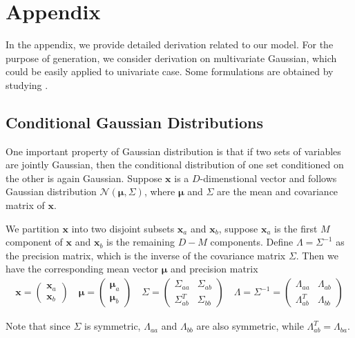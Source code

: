 \newpage
\section{Appendix}
In the appendix, we provide detailed derivation related to our model. For the purpose of generation, we consider derivation on multivariate Gaussian, which could be easily applied to univariate case. Some formulations are obtained by studying \cite{Bishop:2006:PRM:1162264}.
\subsection{Conditional Gaussian Distributions}
{\setlength{\parindent}{0cm}
One important property of Gaussian distribution is that if two sets of variables are jointly Gaussian, then the conditional distribution of one set conditioned on the other is again Gaussian.
Suppose $\mathbf{x}$ is a $D$-dimenstional vector and follows Gaussian distribution $\mathcal{N}\left(\mathbf{\mu},\Sigma\right)$, where $\mathbf{\mu}$ and $\Sigma$ are the mean and covariance matrix of $\mathbf{x}$.

We partition $\mathbf{x}$ into two disjoint subsets $\mathbf{x}_a$ and $\mathbf{x}_b$, suppose $\mathbf{x}_a$ is the first $M$ component of $\mathbf{x}$ and $\mathbf{x}_b$ is the remaining $D-M$ components. Define $\Lambda = \Sigma^{-1}$ as the precision matrix, which is the inverse of the covariance matrix $\Sigma$. Then we have the corresponding mean vector $\mathbf{\mu}$ and precision matrix
\begin{align}
\mathbf{x}=\begin{pmatrix} \mathbf{x}_a \\ \mathbf{x}_b \end{pmatrix}
\quad
\mathbf{\mu}=\begin{pmatrix} \mathbf{\mu}_a \\ \mathbf{\mu}_b \end{pmatrix}
\quad
\Sigma = \begin{pmatrix} 
\Sigma_{aa} & \Sigma_{ab} \\
\Sigma_{ab}^{T} & \Sigma_{bb} 
\end{pmatrix}
\quad
\Lambda = \Sigma^{-1}=\begin{pmatrix} 
\Lambda_{aa} & \Lambda_{ab} \\
\Lambda_{ab}^{T} & \Lambda_{bb} 
\end{pmatrix}
\label{eq:partition}
\end{align}

Note that since $\Sigma$ is symmetric, $\Lambda_{aa}$ and $\Lambda_{bb}$ are also symmetric, while $\Lambda_{ab}^T = \Lambda_{ba}$.

}
